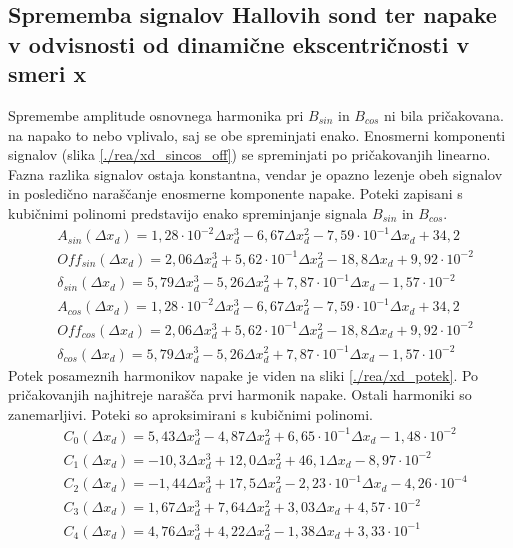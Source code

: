 \subsection{Sprememba signalov Hallovih sond ter napake v odvisnosti od dinamične ekscentričnosti v smeri x}
Spremembe amplitude osnovnega harmonika pri $B_{sin}$ in $B_{cos}$ ni bila pričakovana. na napako to nebo vplivalo, saj se obe spreminjati enako. Enosmerni komponenti signalov (slika \ref{./rea/xd_sincos_off}) se spreminjati po pričakovanjih linearno. Fazna razlika signalov ostaja konstantna, vendar je opazno lezenje obeh signalov in posledično naraščanje enosmerne komponente napake.
Poteki zapisani s kubičnimi polinomi predstavijo enako spreminjanje signala $B_{sin}$ in $B_{cos}$.
\begin{eqnarray}
&A_{sin}(\Delta x_d)=1,28\cdot10^{-2}\Delta x_d^3-6,67\Delta x_d^2-7,59\cdot10^{-1}\Delta x_d+34,2\\
&Off_{sin}(\Delta x_d)=2,06\Delta x_d^3+5,62\cdot10^{-1}\Delta x_d^2-18,8\Delta x_d+9,92\cdot10^{-2}\\
&\delta_{sin}(\Delta x_d)=5,79\Delta x_d^3-5,26\Delta x_d^2+7,87\cdot10^{-1}\Delta x_d-1,57\cdot10^{-2}\\
&A_{cos}(\Delta x_d)=1,28\cdot10^{-2}\Delta x_d^3-6,67\Delta x_d^2-7,59\cdot10^{-1}\Delta x_d+34,2\\
&Off_{cos}(\Delta x_d)=2,06\Delta x_d^3+5,62\cdot10^{-1}\Delta x_d^2-18,8\Delta x_d+9,92\cdot10^{-2}\\
&\delta_{cos}(\Delta x_d)=5,79\Delta x_d^3-5,26\Delta x_d^2+7,87\cdot10^{-1}\Delta x_d-1,57\cdot10^{-2}
\end{eqnarray}
Potek posameznih harmonikov napake je viden na sliki \ref{./rea/xd_potek}. Po pričakovanjih najhitreje narašča prvi harmonik napake. Ostali harmoniki so zanemarljivi. Poteki so aproksimirani s kubičnimi polinomi.
\begin{eqnarray}
&C_0  (\Delta x_d)=5,43\Delta x_d^{3}-4,87\Delta x_d^{2}+6,65\cdot 10^{-1}\Delta x_d-1,48\cdot 10^{-2} \\            
&C_1  (\Delta x_d)=-10,3\Delta x_d^{3}+12,0\Delta x_d^{2}+46,1\Delta x_d-8,97\cdot 10^{-2} \\
&C_2 (\Delta x_d) =-1,44\Delta x_d^{3}+17,5\Delta x_d^{2}-2,23\cdot 10^{-1}\Delta x_d-4,26\cdot 10^{-4} \\   
&C_3 (\Delta x_d) =1,67\Delta x_d^{3}+7,64\Delta x_d^{2}+3,03\Delta x_d+4,57\cdot 10^{-2} \\                         
&C_4  (\Delta x_d)=4,76\Delta x_d^{3}+4,22\Delta x_d^{2}-1,38\Delta x_d+3,33\cdot 10^{-1}  
\end{eqnarray}
